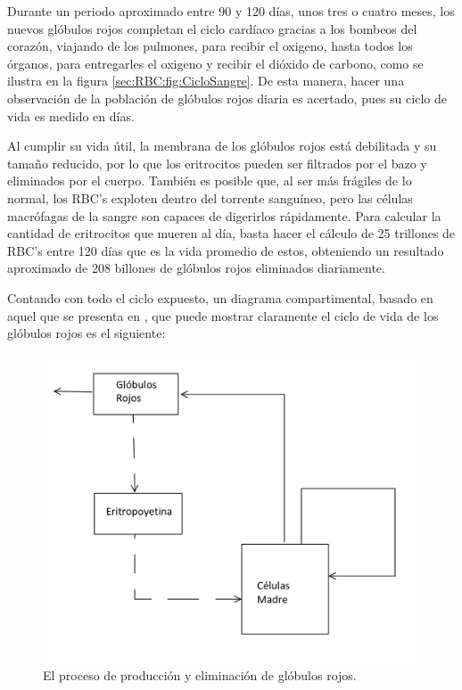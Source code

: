 Durante un periodo aproximado entre 90 y 120 días, unos tres o cuatro meses, los nuevos glóbulos rojos completan el ciclo cardíaco gracias a los bombeos del corazón, viajando de los pulmones, para recibir el oxigeno, hasta todos los órganos, para entregarles el oxigeno y recibir el dióxido de carbono, como se ilustra en la figura \ref{sec:RBC:fig:CicloSangre}. De esta manera, hacer una observación de la población de glóbulos rojos diaria es acertado, pues su ciclo de vida es medido en días.

Al cumplir su vida útil, la membrana de los glóbulos rojos está debilitada y su tamaño reducido, por lo que los eritrocitos pueden ser filtrados por el bazo y eliminados por el cuerpo. También es posible que, al ser más frágiles de lo normal, los RBC's exploten dentro del torrente sanguíneo, pero las células macrófagas de la sangre son capaces de digerirlos rápidamente. Para calcular la cantidad de eritrocitos que mueren al día, basta hacer el cálculo de 25 trillones de RBC's entre 120 días que es la vida promedio de estos, obteniendo un resultado aproximado de 208 billones de glóbulos rojos eliminados diariamente.

Contando con todo el ciclo expuesto, un diagrama compartimental, basado en aquel que se presenta en \cite{kirk1968mathematical}, que puede mostrar claramente el ciclo de vida de los glóbulos rojos es el siguiente:

\begin{figure}[H]
    \centering
    \includegraphics[scale=0.3]{figures/VidaRBC.jpeg}
    \caption{El proceso de producción y eliminación de glóbulos rojos.}
    \label{sec:RBC:fig:VidaRBC}
\end{figure}

